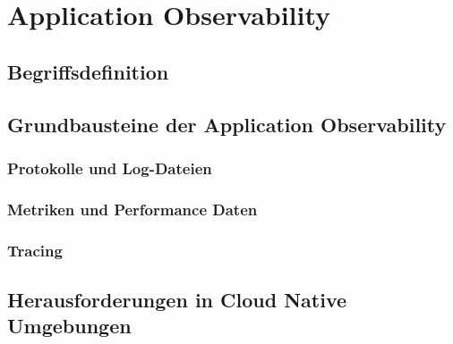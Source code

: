 \newpage
\section{Application Observability}
\subsection{Begriffsdefinition}
\subsection{Grundbausteine der Application Observability}
\subsubsection{Protokolle und Log-Dateien}
\subsubsection{Metriken und Performance Daten}
\subsubsection{Tracing}
\subsection{Herausforderungen in Cloud Native Umgebungen}